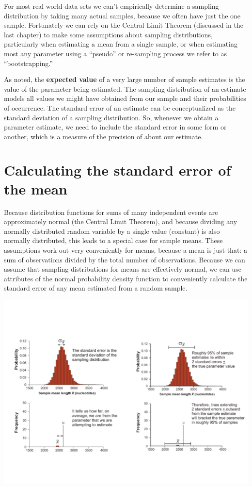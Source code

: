 \documentclass[]{book}
\begin{document}
For most real world data sets we can't empirically determine a sampling distribution by taking many actual samples, because we often have just the one sample. Fortunately we can rely on the Central Limit Theorem (discussed in the last chapter) to make some assumptions about sampling distributions, particularly when estimating a mean from a single sample, or when estimating most any parameter using a ``pseudo'' or re-sampling process we refer to as ``bootstrapping.''

As noted, the \textbf{expected value} of a very large number of sample estimates is the value of the parameter being estimated. The sampling distribution of an estimate models all values we might have obtained from our sample and their probabilities of occurrence. The standard error of an estimate can be conceptualized as the standard deviation of a sampling distribution. So, whenever we obtain a parameter estimate, we need to include the standard error in some form or another, which is a measure of the precision of about our estimate.

\hypertarget{calculating-the-standard-error-of-the-mean}{%
\section{Calculating the standard error of the mean}\label{calculating-the-standard-error-of-the-mean}}

Because distribution functions for sums of many independent events are approximately normal (the Central Limit Theorem), and because dividing any normally distributed random variable by a single value (constant) is also normally distributed, this leads to a special case for sample means. These assumptions work out very conveniently for means, because a mean is just that: a sum of observations divided by the total number of observations. Because we can assume that sampling distributions for means are effectively normal, we can use attributes of the normal probability density function to conveniently calculate the standard error of any mean estimated from a random sample.

\begin{center}\includegraphics[width=1\linewidth]{images/week_2.028} \end{center}
\end{document}

